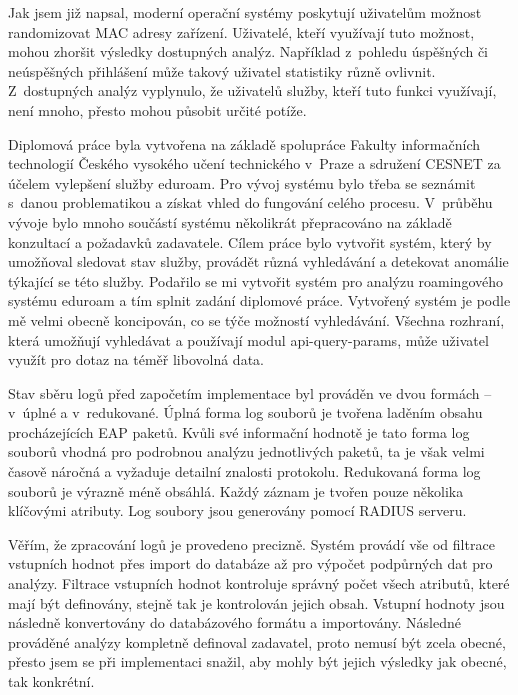 \documentclass[thesis=M,czech]{FITthesis}[2012/06/26]
\begin{document}
      Jak jsem již napsal, moderní operační systémy
      poskytují uživatelům možnost randomizovat MAC adresy zařízení.
      Uživatelé, kteří využívají tuto možnost, mohou zhoršit výsledky dostupných analýz.
      Například z~pohledu úspěšných či neúspěšných přihlášení
      může takový uživatel statistiky různě ovlivnit.
      Z~dostupných analýz vyplynulo, že uživatelů služby,
      kteří tuto funkci využívají, není mnoho,
      přesto mohou působit určité potíže.

\begin{conclusion}

  Diplomová práce byla vytvořena na základě spolupráce Fakulty informačních technologií
  Českého vysokého učení technického v~Praze a sdružení CESNET za účelem vylepšení služby eduroam.
  Pro vývoj systému bylo třeba se seznámit s~danou problematikou a získat vhled do fungování celého procesu.
  V~průběhu vývoje bylo mnoho součástí systému několikrát přepracováno na základě konzultací a požadavků zadavatele.
  Cílem práce bylo vytvořit systém, který by umožňoval sledovat stav služby,
  provádět různá vyhledávání a detekovat anomálie týkající se této služby.
  Podařilo se mi vytvořit systém pro analýzu roamingového systému eduroam a tím splnit zadání diplomové práce.
  Vytvořený systém je podle mě velmi obecně koncipován, co se týče možností vyhledávání.
  Všechna rozhraní, která umožňují vyhledávat a používají modul api-query-params, může
  uživatel využít pro dotaz na téměř libovolná data.

  Stav sběru logů před započetím implementace byl prováděn ve dvou formách -- v~úplné a v~redukované.
  Úplná forma log souborů je tvořena laděním obsahu procházejících EAP paketů.
  Kvůli své informační hodnotě je tato forma log souborů vhodná pro podrobnou
  analýzu jednotlivých paketů, ta je však velmi časově náročná a vyžaduje detailní znalosti protokolu.
  Redukovaná forma log souborů je výrazně méně obsáhlá. 
  Každý záznam je tvořen pouze několika klíčovými atributy.
  Log soubory jsou generovány pomocí RADIUS serveru.

  Věřím, že zpracování logů je provedeno precizně. 
  Systém provádí vše od filtrace vstupních hodnot přes import do databáze až pro výpočet podpůrných dat pro analýzy.
  Filtrace vstupních hodnot kontroluje správný počet všech atributů, které mají být definovány,
  stejně tak je kontrolován jejich obsah.
  Vstupní hodnoty jsou následně konvertovány do databázového formátu a importovány.
  Následné prováděné analýzy kompletně definoval zadavatel, 
  proto nemusí být zcela obecné, přesto jsem se při implementaci snažil, aby mohly být jejich výsledky jak obecné, tak konkrétní.


\end{conclusion}
\end{document}
